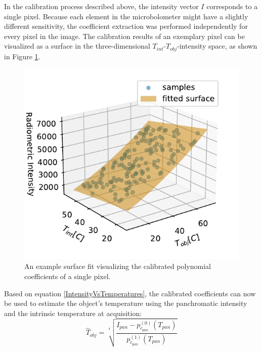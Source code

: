 In the calibration process described above, the intensity vector $I$ corresponds to a single pixel.
Because each element in the microbolometer might have a slightly different sensitivity, the coefficient extraction was performed independently for every pixel in the image.
The calibration results of an exemplary pixel can be visualized as a surface in the three-dimensional $T_\mathit{int}$-$T_\mathit{obj}$-intensity space, as shown in Figure \ref{physical_model_fit}.
\begin{figure}[H]
  \centering
  \includegraphics[width=0.7\linewidth]{../figs/methods/physical_model_tight.pdf}
  \caption{An example surface fit visualizing the calibrated polynomial coefficients of a single pixel.}
  \label{physical_model_fit}
\end{figure}

Based on equation \ref{IntensityVsTemperatures}, the calibrated coefficients can now be used to estimate the object's temperature using the panchromatic intensity and the intrinsic temperature at acquisition:
\begin{equation} \label{eq:backward_poly}
  \hat{T}_\mathit{obj} = \sqrt[4]{\frac{I_\mathit{pan} - p^{(0)}_{c_\mathit{pan}}(T_\mathit{pan})}{p^{(1)}_{c_\mathit{pan}}(T_\mathit{pan})}}
\end{equation}

